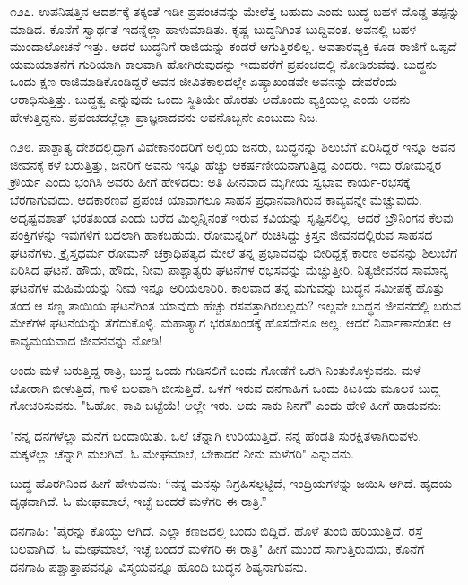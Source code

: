 ೧೨೭. ಉಪನಿಷತ್ತಿನ ಆದರ್ಶಕ್ಕೆ ತಕ್ಕಂತೆ ಇಡೀ ಪ್ರಪಂಚವನ್ನು ಮೇಲೆತ್ತ ಬಹುದು ಎಂದು ಬುದ್ಧ ಬಹಳ ದೊಡ್ಡ ತಪ್ಪನ್ನು ಮಾಡಿದ. ಕೊನೆಗೆ ಸ್ವಾರ್ಥತೆ ಇದನ್ನೆಲ್ಲಾ ಹಾಳುಮಾಡಿತು. ಕೃಷ್ಣ ಬುದ್ಧನಿಗಿಂತ ಬುದ್ದಿವಂತ. ಅವನಲ್ಲಿ ಬಹಳ ಮುಂದಾಲೋಚನೆ ಇತ್ತು. ಆದರೆ ಬುದ್ಧನಿಗೆ ರಾಜಿಯನ್ನು ಕಂಡರೆ ಆಗುತ್ತಿರಲಿಲ್ಲ. ಅವತಾರವ್ಯಕ್ತಿ ಕೂಡ ರಾಜಿಗೆ ಒಪ್ಪದೆ ಯಮಯಾತನೆಗೆ ಗುರಿಯಾಗಿ ಕಾಲವಾಗಿ ಹೋಗಿರುವುದನ್ನು ಇದುವರೆಗೆ ಪ್ರಪಂಚದಲ್ಲಿ ನೋಡಿರುವೆವು. ಬುದ್ಧನು ಒಂದು ಕ್ಷಣ ರಾಜಿಮಾಡಿಕೊಂಡಿದ್ದರೆ ಅವನ ಜೀವಿತಕಾಲದಲ್ಲೇ ಏಷ್ಯಾಖಂಡವೇ ಅವನನ್ನು ದೇವರೆಂದು ಆರಾಧಿಸುತ್ತಿತ್ತು. ಬುದ್ಧತ್ವ ಎನ್ನುವುದು ಒಂದು ಸ್ಥಿತಿಯೇ ಹೊರತು ಅದೊಂದು ವ್ಯಕ್ತಿಯಲ್ಲ ಎಂದು ಅವನು ಹೇಳುತ್ತಿದ್ದನು. ಪ್ರಪಂಚದಲ್ಲೆಲ್ಲಾ ಪ್ರಾಜ್ಞನಾದವನು ಅವನೊಬ್ಬನೇ ಎಂಬುದು ನಿಜ.

೧೨೮. ಪಾಶ್ಚಾತ್ಯ ದೇಶದಲ್ಲಿದ್ದಾಗ ವಿವೇಕಾನಂದರಿಗೆ ಅಲ್ಲಿಯ ಜನರು, ಬುದ್ಧನನ್ನು ಶಿಲುಬೆಗೆ ಏರಿಸಿದ್ದರೆ ಇನ್ನೂ ಅವನ ಜೀವನಕ್ಕೆ ಕಳೆ ಬರುತ್ತಿತ್ತು, ಜನರಿಗೆ ಅವನು ಇನ್ನೂ ಹೆಚ್ಚು ಆಕರ್ಷಣೀಯನಾಗುತ್ತಿದ್ದ ಎಂದರು. ಇದು ರೋಮನ್ನರ ಕ್ರೌರ್ಯ ಎಂದು ಭಂಗಿಸಿ ಅವರು ಹೀಗೆ ಹೇಳಿದರು: ಅತಿ ಹೀನವಾದ ಮೃಗೀಯ ಸ್ವಭಾವ ಕಾರ್ಯ-ರಭಸಕ್ಕೆ ಬೆರಗಾಗುವುದು. ಆದಕಾರಣವೆ ಪ್ರಪಂಚ ಯಾವಾಗಲೂ ಸಾಹಸ ಪ್ರಧಾನವಾಗಿರುವ ಕಾವ್ಯವನ್ನೇ ಮೆಚ್ಚುವುದು. ಅದೃಷ್ಟವಶಾತ್ ಭರತಖಂಡ  ಎಂದು ಬರೆದ ಮಿಲ್ಟನ್ನಿನಂತೆ ಇರುವ ಕವಿಯನ್ನು ಸೃಷ್ಟಿಸಲಿಲ್ಲ. ಆದರೆ ಬ್ರೌನಿಂಗನ ಕೆಲವು ಪಂಕ್ತಿಗಳನ್ನು ಇವುಗಳಿಗೆ ಬದಲಾಗಿ ಹಾಕಬಹುದು. ರೋಮನ್ನರಿಗೆ ರುಚಿಸಿದ್ದು ಕ್ರಿಸ್ತನ ಜೀವನದಲ್ಲಿರುವ ಸಾಹಸದ ಘಟನೆಗಳು. ಕ್ರೈಸ್ತಧರ್ಮ ರೋಮನ್ ಚಕ್ರಾಧಿಪತ್ಯದ ಮೇಲೆ ತನ್ನ ಪ್ರಭಾವವನ್ನು ಬೀರಿದ್ದಕ್ಕೆ ಕಾರಣ ಅವನನ್ನು ಶಿಲುಬೆಗೆ ಏರಿಸಿದ ಘಟನೆ. ಹೌದು, ಹೌದು, ನೀವು ಪಾಶ್ಚಾತ್ಯರು ಘಟನೆಗಳ ರಭಸವನ್ನು ಮೆಚ್ಚುತ್ತೀರಿ. ನಿತ್ಯಜೀವನದ ಸಾಮಾನ್ಯ ಘಟನೆಗಳ ಮಹಿಮೆಯನ್ನು ನೀವು ಇನ್ನೂ ಅರಿಯಲಾರಿರಿ. ಕಾಲವಾದ ತನ್ನ ಮಗುವನ್ನು ಬುದ್ಧನ ಸಮೀಪಕ್ಕೆ ಹೊತ್ತು ತಂದ ಆ ಸಣ್ಣ ತಾಯಿಯ ಘಟನೆಗಿಂತ ಯಾವುದು ಹೆಚ್ಚು ರಸವತ್ತಾಗಿರಬಲ್ಲದು? ಇಲ್ಲವೇ ಬುದ್ಧನ ಜೀವನದಲ್ಲಿ ಬರುವ ಮೇಕೆಗಳ ಘಟನೆಯನ್ನು ತೆಗೆದುಕೊಳ್ಳಿ. ಮಹಾತ್ಯಾಗ ಭರತಖಂಡಕ್ಕೆ ಹೊಸದೇನೂ ಅಲ್ಲ. ಆದರೆ ನಿರ್ವಾಣಾನಂತರ ಆ ಕಾವ್ಯಮಯವಾದ ಜೀವನವನ್ನು ನೋಡಿ!

ಅಂದು ಮಳೆ ಬರುತ್ತಿದ್ದ ರಾತ್ರಿ, ಬುದ್ಧ ಒಂದು ಗುಡಿಸಲಿಗೆ ಬಂದು ಗೋಡೆಗೆ ಒರಗಿ ನಿಂತುಕೊಳ್ಳುವನು. ಮಳೆ ಜೋರಾಗಿ ಬೀಳುತ್ತಿದೆ, ಗಾಳಿ ಬಲವಾಗಿ ಬೀಸುತ್ತಿದೆ. ಒಳಗೆ ಇರುವ ದನಗಾಹಿಗೆ ಒಂದು ಕಿಟಕಿಯ ಮೂಲಕ ಬುದ್ಧ ಗೋಚರಿಸುವನು. "ಓಹೋ, ಕಾವಿ ಬಟ್ಟೆಯೆ! ಅಲ್ಲೇ ಇರು. ಅದು ಸಾಕು ನಿನಗೆ" ಎಂದು ಹೇಳಿ ಹೀಗೆ ಹಾಡುವನು:

"ನನ್ನ ದನಗಳೆಲ್ಲಾ ಮನೆಗೆ ಬಂದಾಯಿತು. ಒಲೆ ಚೆನ್ನಾಗಿ ಉರಿಯುತ್ತಿದೆ. ನನ್ನ ಹೆಂಡತಿ ಸುರಕ್ಷಿತಳಾಗಿರುವಳು. ಮಕ್ಕಳೆಲ್ಲಾ ಚೆನ್ನಾಗಿ ಮಲಗಿವೆ. ಓ ಮೇಘಮಾಲೆ, ಬೇಕಾದರೆ ನೀನು ಮಳೆಗರಿ" ಎನ್ನುವನು.

ಬುದ್ಧ ಹೊರಗಿನಿಂದ ಹೀಗೆ ಹೇಳುವನು: “ನನ್ನ ಮನಸ್ಸು ನಿಗ್ರಹಿಸಲ್ಪಟ್ಟಿದೆ, ಇಂದ್ರಿಯಗಳನ್ನು ಜಯಿಸಿ ಆಗಿದೆ. ಹೃದಯ ದೃಢವಾಗಿದೆ. ಓ ಮೇಘಮಾಲೆ, ಇಚ್ಛೆ ಬಂದರೆ ಮಳೆಗರಿ ಈ ರಾತ್ರಿ.”

ದನಗಾಹಿ: "ಪೈರನ್ನು ಕೊಯ್ದು ಆಗಿದೆ. ಎಲ್ಲಾ ಕಣಜದಲ್ಲಿ ಬಂದು ಬಿದ್ದಿದೆ. ಹೊಳೆ ತುಂಬಿ ಹರಿಯುತ್ತಿದೆ. ರಸ್ತೆ ಬಲವಾಗಿದೆ. ಓ ಮೇಘಮಾಲೆ, ಇಚ್ಛೆ ಬಂದರೆ ಮಳೆಗರಿ ಈ ರಾತ್ರಿ" ಹೀಗೆ ಮುಂದೆ ಸಾಗುತ್ತಿರುವುದು, ಕೊನೆಗೆ ದನಗಾಹಿ ಪಶ್ಚಾತ್ತಾಪವನ್ನೂ ವಿಸ್ಮಯವನ್ನೂ ಹೊಂದಿ ಬುದ್ಧನ ಶಿಷ್ಯನಾಗುವನು.


